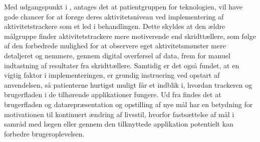 Med udgangspunkt i \citep{mercer2016}, antages det at patientgruppen for teknologien, vil have gode chancer for at forøge deres aktivitetsniveau ved implementering af aktivitetstrackere som et led i behandlingen. Dette skyldes at den ældre målgruppe finder aktivitetstrackere mere motiverende end skridttællere, som følge af den forbedrede mulighed for at observere eget aktivitetsmønster mere detaljeret og nemmere, gennem digital overførsel af data, frem for manuel indtastning af resultater fra skridttællere. Samtidig er det også fundet, at en vigtig faktor i implementeringen, er grundig instruering ved opstart af anvendelsen, så patienterne hurtigst muligt får et indblik i, hvordan trackeren og brugerfladen i de tilhørende applikationer fungere. Ud fra \citep{rapp2016} findes det at brugerfladen og datarepræsentation og opstilling af nye mål har en betydning for motivationen til kontinuert ændring af livsstil, hvorfor fastsættelse af mål i samråd med lægen eller gennem den tilknyttede applikation potentielt kan forbedre brugeroplevelsen.